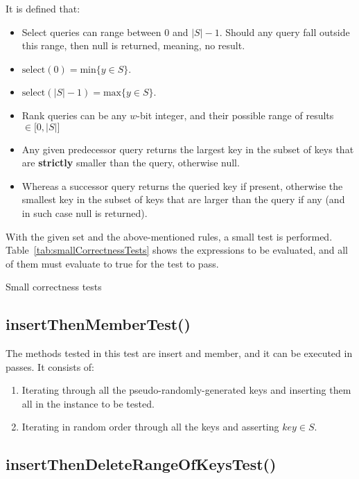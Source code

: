 It is defined that:
\begin{itemize}
    \item
    Select queries can range between $0$ and $|S|-1$. Should any query fall outside this range, then {\ttfamily null} is returned, meaning, no result.
    \item
    $\text{select}(0) = \text{min}\{y \in S \}$.
    \item
    $\text{select}(|S|-1) = \text{max}\{y \in S\}$.
    \item
    Rank queries can be any $w$-bit integer, and their possible range of results $\in \big[ 0, |S| \big]$
    \item
    Any given predecessor query returns the largest key in the subset of keys that are \textbf{strictly} smaller than the query, otherwise {\ttfamily null}.
    \item
    Whereas a successor query returns the queried key if present, otherwise the smallest key in the subset of keys that are larger than the query if any (and in such case {\ttfamily null} is returned).
\end{itemize}

With the given set and the above-mentioned rules, a small test is performed. Table~\ref{tab:smallCorrectnessTests} shows the expressions to be evaluated, and all of them must evaluate to {\ttfamily true} for the test to pass.

\begin{table}[H]
\centering

\caption{Small correctness tests}
\label{tab:smallCorrectnessTests}
\end{table}


\subsection{{\ttfamily insertThenMemberTest()}}

The methods tested in this test are {\ttfamily insert} and {\ttfamily member}, and it can be executed in passes. It consists of:
\begin{enumerate}
    \item
    Iterating through all the pseudo-randomly-generated keys and inserting them all in the instance to be tested.
    \item
    Iterating in random order through all the keys and asserting $key \in S$.
\end{enumerate}

\subsection{{\ttfamily insertThenDeleteRangeOfKeysTest()}}

